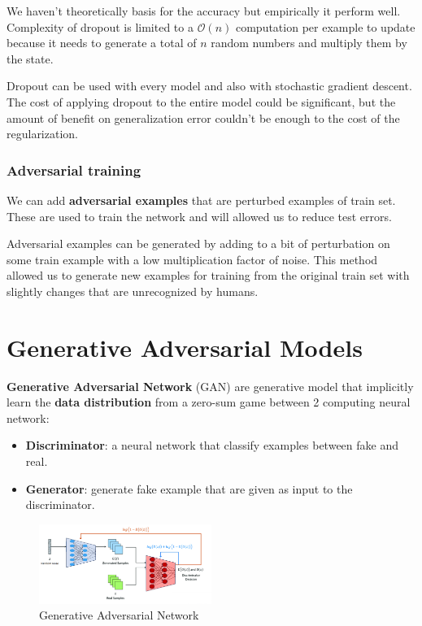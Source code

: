 We haven't theoretically basis for the accuracy but empirically it perform well.
Complexity of dropout is limited to a $\mathcal{O}(n)$ computation per example
to update because it needs to generate a total of $n$ random numbers and multiply
them by the state.

Dropout can be used with every model and also with stochastic gradient descent.
The cost of applying dropout to the entire model could be significant, but the
amount of benefit on generalization error couldn't be enough to the cost of the
regularization.
\subsubsection{Adversarial training}
We can add \textbf{adversarial examples} that are perturbed examples of train
set. These are used to train the network and will allowed us to reduce test errors.

Adversarial examples can be generated by adding to a bit of perturbation on some
train example with a low multiplication factor of noise. This method allowed us
to generate new examples for training from the original train set with slightly
changes that are unrecognized by humans.
\section{Generative Adversarial Models}
\textbf{Generative Adversarial Network} (GAN) are generative model that
implicitly learn the \textbf{data distribution} from a zero-sum game between 2
computing neural network:
\begin{itemize}
    \item \textbf{Discriminator}: a neural network that classify examples between
          fake and real.
    \item \textbf{Generator}: generate fake example that are given as input to the
          discriminator.
\end{itemize}

\begin{figure}[!ht]
    \centering
    \includegraphics[width=0.5\textwidth]{img/GAN.png}
    \caption{Generative Adversarial Network}
    \label{fig:gan}
\end{figure}

